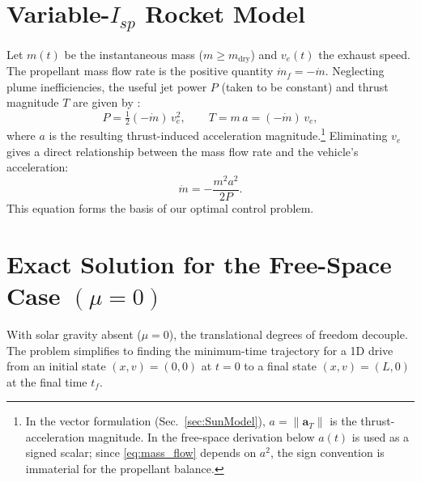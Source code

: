 \documentclass[journal,a4paper]{IEEEtran}
\begin{document}
\section{Variable-$I_{\!sp}$ Rocket Model}
Let $m(t)$ be the instantaneous mass ($m \ge m_\mathrm{dry}$) and $v_e(t)$ the exhaust speed. The propellant mass flow rate is the positive quantity $\dot m_f = -\dot m$. Neglecting plume inefficiencies, the useful jet power $P$ (taken to be constant) and thrust magnitude $T$ are given by \cite{Sutton2017}:
\begin{equation}
  P = \tfrac12 (-\dot m)\,v_e^{2},\qquad
  T   = m\,a = (-\dot m)\,v_e,
  \label{eq:power_thrust}
\end{equation}
where $a$ is the resulting thrust-induced acceleration magnitude.\footnote{In the vector formulation (Sec.~\ref{sec:SunModel}), \(a=\|\mathbf{a}_T\|\) is the thrust-acceleration magnitude. In the free-space derivation below \(a(t)\) is used as a signed scalar; since \eqref{eq:mass_flow} depends on \(a^2\), the sign convention is immaterial for the propellant balance.} Eliminating $v_e$ gives a direct relationship between the mass flow rate and the vehicle's acceleration:
\begin{equation}
  \dot m = -\frac{m^{2}a^{2}}{2P}.
  \label{eq:mass_flow}
\end{equation}
This equation forms the basis of our optimal control problem.

\section{Exact Solution for the Free-Space Case $(\mu=0)$}
\label{sec:free_space_solution}
With solar gravity absent ($\mu=0$), the translational degrees of freedom decouple. The problem simplifies to finding the minimum-time trajectory for a 1D drive from an initial state $(x, v) = (0, 0)$ at $t=0$ to a final state $(x, v) = (L, 0)$ at the final time $t_f$.
\end{document}
